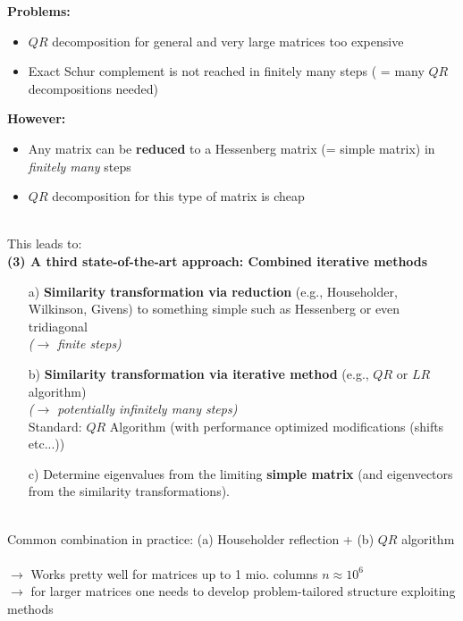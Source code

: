  
%
\begin{frame}
\textbf{Problems:}\\
\begin{itemize}
	\item $QR$ decomposition for general and very large matrices too expensive
	\item Exact Schur complement is not reached in finitely many steps ( = many $QR$ decompositions needed)
\end{itemize}
\textbf{However:}
\begin{itemize}
	\item Any matrix can be \textbf{\color{magenta}reduced} to a Hessenberg matrix (= simple matrix) in \textit{finitely many} steps
	\item $QR$ decomposition for this type of matrix is cheap
\end{itemize}
~\\
This leads to:\\
\textbf{(3) A third state-of-the-art approach: Combined iterative methods}
\begin{itemize}
	\item[a)] \textbf{\color{magenta}Similarity transformation via reduction} (e.g., Householder, Wilkinson, Givens) to something simple such as Hessenberg or even tridiagonal\\ \textit{($\rightarrow$ finite steps)}
	\vspace{0.25cm}\item[b)] \textbf{\color{yellow} Similarity transformation via iterative method}  (e.g., $QR$ or $LR$ algorithm)\\ \textit{($\rightarrow$ potentially infinitely many steps)}\\\vspace{0.2cm}
	Standard: $QR$ Algorithm (with performance optimized modifications (shifts etc...))\\	
	\vspace{0.25cm}\item[c)] Determine eigenvalues from the limiting \textbf{\color{codegreen}simple matrix} (and eigenvectors from the similarity transformations).
\end{itemize}
~\\
Common combination in practice: (a) Householder reflection + (b) $QR$ algorithm
~\\
$\rightarrow$ Works pretty well for matrices up to 1 mio. columns $n \approx 10^6$\\
$\rightarrow$ for larger matrices one needs to develop problem-tailored structure exploiting methods 


\end{frame}



